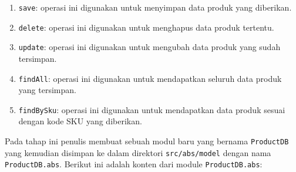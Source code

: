 \begin{enumerate}
    \item \texttt{save}: operasi ini digunakan untuk menyimpan data produk yang diberikan.
    \item \texttt{delete}: operasi ini digunakan untuk menghapus data produk tertentu.
    \item \texttt{update}: operasi ini digunakan untuk mengubah data produk yang sudah tersimpan.
    \item \texttt{findAll}: operasi ini digunakan untuk mendapatkan seluruh data produk yang tersimpan.
    \item \texttt{findBySku}: operasi ini digunakan untuk mendapatkan data produk sesuai dengan kode SKU yang diberikan.
\end{enumerate}

Pada tahap ini penulis membuat sebuah modul baru yang bernama \texttt{ProductDB} yang kemudian disimpan ke dalam direktori \texttt{src/abs/model} dengan nama \texttt{ProductDB.abs}. Berikut ini adalah konten dari module \texttt{ProductDB.abs}:

